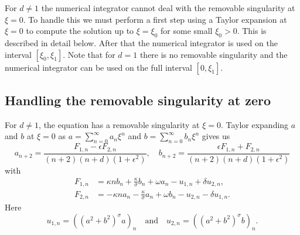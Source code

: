 \documentclass[11pt]{article}
\begin{document}
For \(d \neq 1\) the numerical integrator cannot deal with the
removable singularity at \(\xi = 0\). To handle this we must perform a
first step using a Taylor expansion at \(\xi = 0\) to compute the
solution up to \(\xi = \xi_0\) for some small \(\xi_0 > 0\). This is
described in detail below. After that the numerical integrator is used
on the interval \([\xi_0, \xi_1]\). Note that for \(d = 1\) there is
no removable singularity and the numerical integrator can be used on
the full interval \([0, \xi_1]\).

\subsection{Handling the removable singularity at zero}
\label{sec:solution-zero-removable-singularity}
For \(d \neq 1\), the equation has a removable singularity at
\(\xi = 0\). Taylor expanding \(a\) and \(b\) at \(\xi = 0\) as
\(a = \sum_{n = 0}^{\infty} a_{n}\xi^{n}\) and
\(b = \sum_{n = 0}^{\infty} b_{n}\xi^{n}\) gives us
\begin{equation*}
  a_{n + 2} = \frac{F_{1,n} - \epsilon F_{2,n}}{(n + 2)(n + d)(1 + \epsilon^{2})},\quad
  b_{n + 2} = \frac{\epsilon F_{1,n} + F_{2,n}}{(n + 2)(n + d)(1 + \epsilon^{2})}
\end{equation*}
with
\begin{align*}
  F_{1,n} &= \kappa n b_{n} + \frac{\kappa}{\sigma}b_{n} + \omega a_{n} - u_{1,n} + \delta u_{2,n},\\
  F_{2,n} &= -\kappa n a_{n} - \frac{\kappa}{\sigma}a_{n} + \omega b_{n} - u_{2,n} - \delta u_{1,n}.
\end{align*}
Here
\begin{equation*}
  u_{1,n} = \left((a^{2} + b^{2})^{\sigma}a\right)_{n} \quad\text{and}\quad
  u_{2,n} = \left((a^{2} + b^{2})^{\sigma}b\right)_{n}.
\end{equation*}
\end{document}
